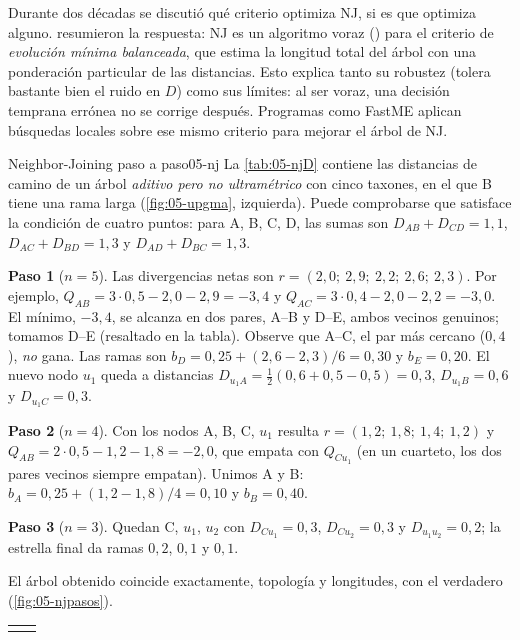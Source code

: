 \begin{profundizacion}
Durante dos décadas se discutió qué criterio optimiza NJ, si es que optimiza alguno. \textcite{c05-gascuel2006} resumieron la respuesta: NJ es un algoritmo voraz () para el criterio de \emph{evolución mínima balanceada}, que estima la longitud total del árbol con una ponderación particular de las distancias. Esto explica tanto su robustez (tolera bastante bien el ruido en $D$) como sus límites: al ser voraz, una decisión temprana errónea no se corrige después. Programas como FastME aplican búsquedas locales sobre ese mismo criterio para mejorar el árbol de NJ.
\end{profundizacion}

\begin{ejemplo}{Neighbor-Joining paso a paso}{05-nj}
La \cref{tab:05-njD} contiene las distancias de camino de un árbol \emph{aditivo pero no ultramétrico} con cinco taxones, en el que B tiene una rama larga (\cref{fig:05-upgma}, izquierda). Puede comprobarse que satisface la condición de cuatro puntos: para A, B, C, D, las sumas son $D_{AB}+D_{CD}=1{,}1$, $D_{AC}+D_{BD}=1{,}3$ y $D_{AD}+D_{BC}=1{,}3$.

\medskip\noindent\textbf{Paso 1} ($n=5$). Las divergencias netas son $r=(2{,}0;\ 2{,}9;\ 2{,}2;\ 2{,}6;\ 2{,}3)$. Por ejemplo, $Q_{AB}=3\cdot0{,}5-2{,}0-2{,}9=-3{,}4$ y $Q_{AC}=3\cdot0{,}4-2{,}0-2{,}2=-3{,}0$. El mínimo, $-3{,}4$, se alcanza en dos pares, A--B y D--E, ambos vecinos genuinos; tomamos D--E (resaltado en la tabla). Observe que A--C, el par más cercano ($0{,}4$), \emph{no} gana. Las ramas son $b_{D}=0{,}25+(2{,}6-2{,}3)/6=0{,}30$ y $b_{E}=0{,}20$. El nuevo nodo $u_1$ queda a distancias $D_{u_1A}=\tfrac12(0{,}6+0{,}5-0{,}5)=0{,}3$, $D_{u_1B}=0{,}6$ y $D_{u_1C}=0{,}3$.

\medskip\noindent\textbf{Paso 2} ($n=4$). Con los nodos A, B, C, $u_1$ resulta $r=(1{,}2;\ 1{,}8;\ 1{,}4;\ 1{,}2)$ y $Q_{AB}=2\cdot0{,}5-1{,}2-1{,}8=-2{,}0$, que empata con $Q_{Cu_1}$ (en un cuarteto, los dos pares vecinos siempre empatan). Unimos A y B: $b_A=0{,}25+(1{,}2-1{,}8)/4=0{,}10$ y $b_B=0{,}40$.

\medskip\noindent\textbf{Paso 3} ($n=3$). Quedan C, $u_1$, $u_2$ con $D_{Cu_1}=0{,}3$, $D_{Cu_2}=0{,}3$ y $D_{u_1u_2}=0{,}2$; la estrella final da ramas $0{,}2$, $0{,}1$ y $0{,}1$.

\medskip El árbol obtenido coincide exactamente, topología y longitudes, con el verdadero (\cref{fig:05-njpasos}).

\begin{center}
\small
\begin{tabular}{@{}c@{\hspace{2em}}c@{}}

&

\end{tabular}
\label{tab:05-njD}
\end{center}
\end{ejemplo}

